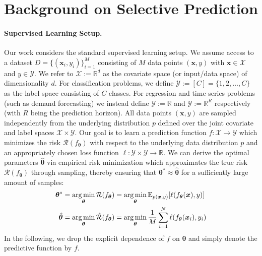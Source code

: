 \section{Background on Selective Prediction}
\label{sec:background_sptd}

\paragraph{Supervised Learning Setup.} Our work considers the standard supervised learning setup. We assume access to a dataset $D = \{(\bm{x}_i,y_i)\}_{i=1}^{M}$ consisting of $M$ data points $(\bm{x},y)$ with $\bm{x} \in \mathcal{X}$ and  $y \in \mathcal{Y}$. We refer to $\mathcal{X} := \mathbb{R}^d$ as the covariate space (or input/data space) of dimensionality $d$. For classification problems, we define $\mathcal{Y} := [C] = \{1, 2, \ldots, C\}$ as the label space consisting of $C$ classes. For regression and time series problems (such as demand forecasting) we instead define $\mathcal{Y} := \mathbb{R}$ and $\mathcal{Y} := \mathbb{R}^R$ respectively (with $R$ being the prediction horizon). All data points $(\bm{x},y)$ are sampled independently from the underlying distribution $p$ defined over the joint covariate and label spaces $\mathcal{X} \times \mathcal{Y}$. Our goal is to learn a prediction function $f : \mathcal{X} \rightarrow \mathcal{Y}$ which minimizes the risk $\mathcal{R}(f_{\bm{\theta}})$ with respect to the underlying data distribution $p$ and an appropriately chosen loss function $\ell : \mathcal{Y} \times \mathcal{Y} \rightarrow \mathbb{R}$. 
We can derive the optimal parameters $\hat{\bm{\theta}}$ via empirical risk minimization which approximates the true risk $\mathcal{R}(f_{\bm{\theta}})$ through sampling, thereby ensuring that $\bm{\theta}^* \approx \hat{\bm{\theta}}$ for a sufficiently large amount of samples:
\begin{align}
    \bm{\theta}^* & = \operatorname*{arg\,min}_{\bm{\theta}} \mathcal{R}(f_{\bm{\theta}}) = \operatorname*{arg\,min}_{\bm{\theta}} \mathbb{E}_{p(\bm{x},y)}[\ell(f_{\bm{\theta}}(\bm{x}),y)] \\ 
    \hat{\bm{\theta}} & = \operatorname*{arg\,min}_{\bm{\theta}} \hat{\mathcal{R}}(f_{\bm{\theta}}) = \operatorname*{arg\,min}_{\bm{\theta}} \frac{1}{M} \sum_{i=1}^{N} \ell(f_{\bm{\theta}}(\bm{x}_i),y_i)
\end{align}
In the following, we drop the explicit dependence of $f$ on $\bm{\theta}$ and simply denote the predictive function by $f$.

